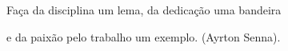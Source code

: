 
\begin{epigrafe}
\vspace*{\fill}
\begin{flushleft}
\justify
\hspace{4cm} Faça da disciplina um lema, da dedicação uma bandeira

\hspace{3,4cm} e da paixão pelo trabalho um exemplo. (Ayrton Senna).
\end{flushleft}

\end{epigrafe}
